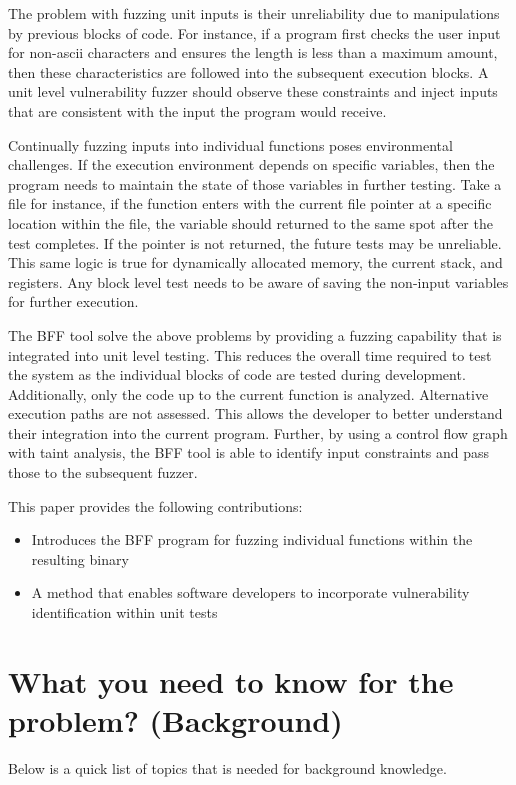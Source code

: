 \documentclass[conference]{IEEEtran}
\begin{document}
The problem with fuzzing unit inputs is their unreliability due to manipulations by previous blocks of code. For instance, if a program first checks the user input for non-ascii characters and ensures the length is less than a maximum amount, then these characteristics are followed into the subsequent execution blocks. A unit level vulnerability fuzzer should observe these constraints and inject inputs that are consistent with the input the program would receive. 

Continually fuzzing inputs into individual functions poses environmental challenges. If the execution environment depends on specific variables, then the program needs to maintain the state of those variables in further testing. Take a file for instance, if the function enters with the current file pointer at a specific location within the file, the variable should returned to the same spot after the test completes. If the pointer is not returned, the future tests may be unreliable. This same logic is true for dynamically allocated memory, the current stack, and registers. Any block level test needs to be aware of saving the non-input variables for further execution.

The BFF tool solve the above problems by providing a fuzzing capability that is integrated into unit level testing. This reduces the overall time required to test the system as the individual blocks of code are tested during development. Additionally, only the code up to the current function is analyzed. Alternative execution paths are not assessed. This allows the developer to better understand their integration into the current program. Further, by using a control flow graph with taint analysis, the BFF tool is able to identify input constraints and pass those to the subsequent fuzzer. 

This paper provides the following contributions:
\begin{itemize}
\item Introduces the BFF program for fuzzing individual functions within the resulting binary
\item A method that enables software developers to incorporate vulnerability identification within unit tests
\end{itemize}


\section{What you need to know for the problem? (Background)}
Below is a quick list of topics that is needed for background knowledge.
\end{document}
